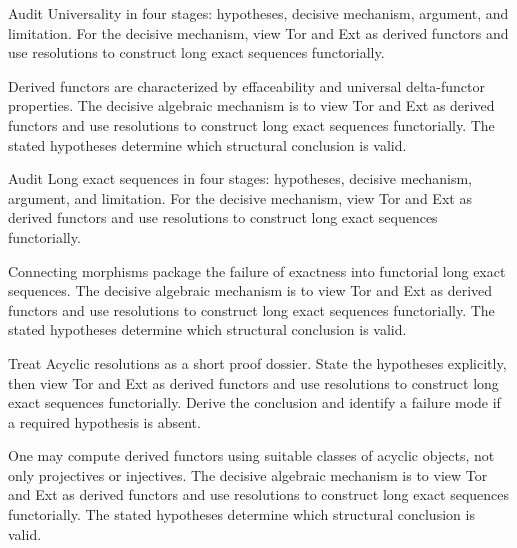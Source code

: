 \begin{problem}\label{prob:v28-problem-06}
Audit Universality in four stages: hypotheses, decisive mechanism, argument, and limitation. For the decisive mechanism, view Tor and Ext as derived functors and use resolutions to construct long exact sequences functorially.
\end{problem}
\begin{solution}
Derived functors are characterized by effaceability and universal delta-functor properties. The decisive algebraic mechanism is to view Tor and Ext as derived functors and use resolutions to construct long exact sequences functorially. The stated hypotheses determine which structural conclusion is valid.
\end{solution}

\begin{problem}\label{prob:v28-problem-07}
Audit Long exact sequences in four stages: hypotheses, decisive mechanism, argument, and limitation. For the decisive mechanism, view Tor and Ext as derived functors and use resolutions to construct long exact sequences functorially.
\end{problem}
\begin{solution}
Connecting morphisms package the failure of exactness into functorial long exact sequences. The decisive algebraic mechanism is to view Tor and Ext as derived functors and use resolutions to construct long exact sequences functorially. The stated hypotheses determine which structural conclusion is valid.
\end{solution}

\begin{problem}\label{prob:v28-problem-08}
Treat Acyclic resolutions as a short proof dossier. State the hypotheses explicitly, then view Tor and Ext as derived functors and use resolutions to construct long exact sequences functorially. Derive the conclusion and identify a failure mode if a required hypothesis is absent.
\end{problem}
\begin{solution}
One may compute derived functors using suitable classes of acyclic objects, not only projectives or injectives. The decisive algebraic mechanism is to view Tor and Ext as derived functors and use resolutions to construct long exact sequences functorially. The stated hypotheses determine which structural conclusion is valid.
\end{solution}

